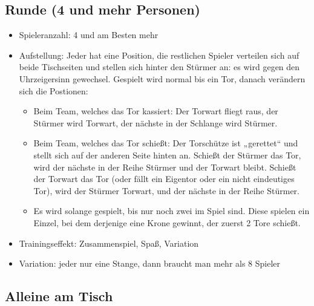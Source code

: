 \subsection{Runde (4 und mehr Personen)}
\label{spielformen:npersonen:runde}
\begin{itemize}
\item Spieleranzahl: 4 und am Besten mehr 
\item Aufstellung: Jeder hat eine Position, die restlichen Spieler verteilen sich auf beide Tischseiten und stellen sich hinter den Stürmer an: es wird gegen den Uhrzeigersinn gewechsel.
Gespielt wird normal bis ein Tor, danach verändern sich die Postionen:
\begin{itemize}
\item Beim Team, welches das Tor kassiert: Der Torwart fliegt raus, der Stürmer
wird Torwart, der nächste in der Schlange wird Stürmer.
\item Beim Team, welches das Tor schießt: Der Torschütze ist „gerettet“ und stellt
sich auf der anderen Seite hinten an. Schießt der Stürmer das Tor, wird der
nächste in der Reihe Stürmer und der Torwart bleibt. Schießt der Torwart
das Tor (oder fällt ein Eigentor oder ein nicht eindeutiges Tor), wird der
Stürmer Torwart, und der nächste in der Reihe Stürmer.
\item Es wird solange gespielt, bis nur noch zwei im Spiel sind. Diese spielen ein Einzel, bei dem derjenige eine Krone gewinnt, der zuerst 2 Tore schießt.
\end{itemize}
\item Trainingseffekt: Zusammenspiel, Spaß, Variation
\item Variation: jeder nur eine Stange, dann braucht man mehr als 8 Spieler
\end{itemize}


\subsection{Alleine am Tisch}
\label{spielformen:npersonen:alleine}

